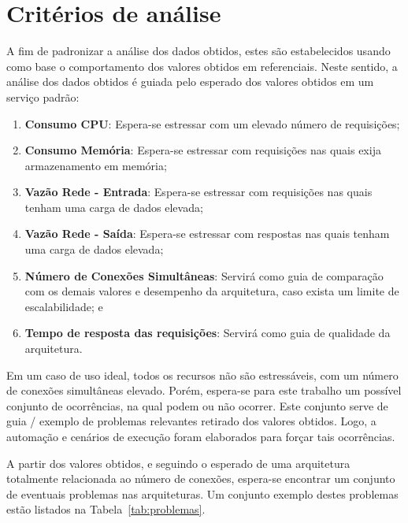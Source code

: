 \section{Critérios de análise}
\label{sec:criterios}

A fim de padronizar a análise dos dados obtidos, estes são estabelecidos usando como base o comportamento dos valores obtidos em referenciais.
%
Neste sentido, a análise dos dados obtidos é guiada pelo esperado dos valores obtidos em um serviço padrão:

\begin{enumerate}
  \item \textbf{Consumo CPU}: Espera-se estressar com um elevado número de requisições;
  \item \textbf{Consumo Memória}: Espera-se estressar com requisições nas quais exija armazenamento em memória;
  \item \textbf{Vazão Rede - Entrada}: Espera-se estressar com requisições nas quais tenham uma carga de dados elevada;
  \item \textbf{Vazão Rede - Saída}: Espera-se estressar com respostas nas quais tenham uma carga de dados elevada;
  \item \textbf{Número de Conexões Simultâneas}: Servirá como guia de comparação com os demais valores e desempenho da arquitetura, caso exista um limite de escalabilidade; e
  \item \textbf{Tempo de resposta das requisições}: Servirá como guia de qualidade da arquitetura.
\end{enumerate}

Em um caso de uso ideal, todos os recursos não são estressáveis, com um número de conexões simultâneas elevado.
%
Porém, espera-se para este trabalho um possível conjunto de ocorrências, na qual podem ou não ocorrer.
%
Este conjunto serve de guia / exemplo de problemas relevantes retirado dos valores obtidos.
%
Logo, a automação e cenários de execução foram elaborados para forçar tais ocorrências.


A partir dos valores obtidos, e seguindo o esperado de uma arquitetura totalmente relacionada ao número de conexões, espera-se encontrar um conjunto de eventuais problemas nas arquiteturas.
%
Um conjunto exemplo destes problemas estão listados na Tabela~\ref{tab:problemas}.
\pagebreak

